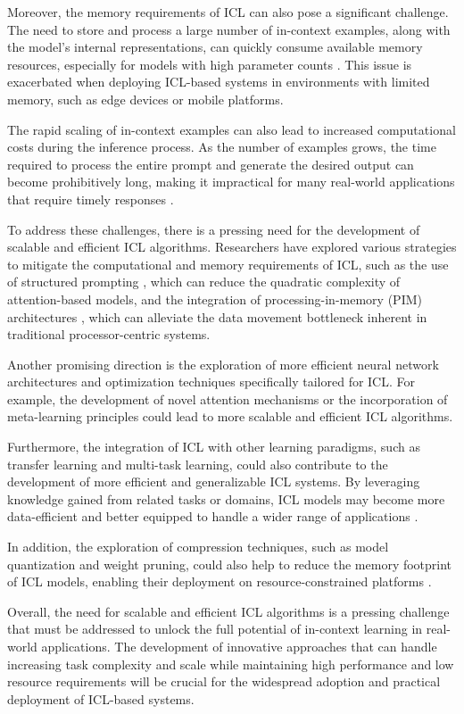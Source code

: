 \documentclass[11pt]{article}
\begin{document}
Moreover, the memory requirements of ICL can also pose a significant challenge. The need to store and process a large number of in-context examples, along with the model's internal representations, can quickly consume available memory resources, especially for models with high parameter counts \cite{ref332}. This issue is exacerbated when deploying ICL-based systems in environments with limited memory, such as edge devices or mobile platforms.

The rapid scaling of in-context examples can also lead to increased computational costs during the inference process. As the number of examples grows, the time required to process the entire prompt and generate the desired output can become prohibitively long, making it impractical for many real-world applications that require timely responses \cite{ref331}.

To address these challenges, there is a pressing need for the development of scalable and efficient ICL algorithms. Researchers have explored various strategies to mitigate the computational and memory requirements of ICL, such as the use of structured prompting \cite{ref331}, which can reduce the quadratic complexity of attention-based models, and the integration of processing-in-memory (PIM) architectures \cite{ref332}, which can alleviate the data movement bottleneck inherent in traditional processor-centric systems.

Another promising direction is the exploration of more efficient neural network architectures and optimization techniques specifically tailored for ICL. For example, the development of novel attention mechanisms \cite{ref333} or the incorporation of meta-learning principles \cite{ref334} could lead to more scalable and efficient ICL algorithms.

Furthermore, the integration of ICL with other learning paradigms, such as transfer learning and multi-task learning, could also contribute to the development of more efficient and generalizable ICL systems. By leveraging knowledge gained from related tasks or domains, ICL models may become more data-efficient and better equipped to handle a wider range of applications \cite{ref335}.

In addition, the exploration of compression techniques, such as model quantization and weight pruning, could also help to reduce the memory footprint of ICL models, enabling their deployment on resource-constrained platforms \cite{ref336}.

Overall, the need for scalable and efficient ICL algorithms is a pressing challenge that must be addressed to unlock the full potential of in-context learning in real-world applications. The development of innovative approaches that can handle increasing task complexity and scale while maintaining high performance and low resource requirements will be crucial for the widespread adoption and practical deployment of ICL-based systems.
\end{document}
